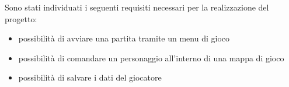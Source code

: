 Sono stati individuati i seguenti requisiti necessari per la realizzazione del progetto:
\begin{itemize}
	\item possibilità di avviare una partita tramite un menu di gioco
	\item possibilità di comandare un personaggio all'interno di una mappa di gioco
	\item possibilità di salvare i dati del giocatore
\end{itemize}
